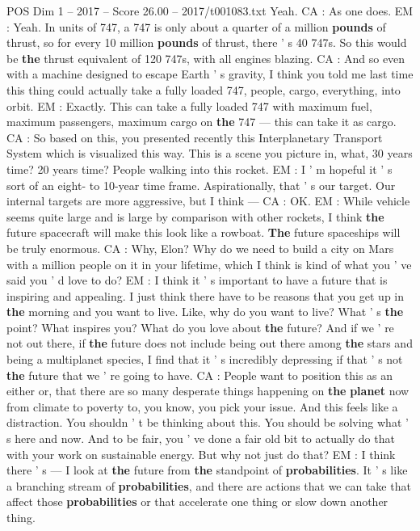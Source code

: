 \begin{textsample}{POS Dim 1 – 2017 – Score 26.00 – 2017/t001083.txt}
Yeah.
CA : As one does.
EM : Yeah.
In units of 747, a 747 is only about a quarter of a million \textbf{pounds} of thrust, so for every 10 million \textbf{pounds} of thrust, there ' s 40 747s.
So this would be \textbf{the} thrust equivalent of 120 747s, with all engines blazing.
CA : And so even with a machine designed to escape Earth ' s gravity, I think you told me last time this thing could actually take a fully loaded 747, people, cargo, everything, into orbit.
EM : Exactly.
This can take a fully loaded 747 with maximum fuel, maximum passengers, maximum cargo on \textbf{the} 747 — this can take it as cargo.
CA : So based on this, you presented recently this Interplanetary Transport System which is visualized this way.
This is a scene you picture in, what, 30 years time? 20 years time?
People walking into this rocket.
EM : I ' m hopeful it ' s sort of an eight- to 10-year time frame.
Aspirationally, that ' s our target.
Our internal targets are more aggressive, but I think — CA : OK.
EM : While vehicle seems quite large and is large by comparison with other rockets, I think \textbf{the} future spacecraft will make this look like a rowboat. \textbf{The} future spaceships will be truly enormous.
CA : Why, Elon?
Why do we need to build a city on Mars with a million people on it in your lifetime, which I think is kind of what you ' ve said you ' d love to do?
EM : I think it ' s important to have a future that is inspiring and appealing.
I just think there have to be reasons that you get up in \textbf{the} morning and you want to live.
Like, why do you want to live?
What ' s \textbf{the} point?
What inspires you?
What do you love about \textbf{the} future?
And if we ' re not out there, if \textbf{the} future does not include being out there among \textbf{the} stars and being a multiplanet species, I find that it ' s incredibly depressing if that ' s not \textbf{the} future that we ' re going to have.
CA : People want to position this as an either or, that there are so many desperate things happening on \textbf{the} \textbf{planet} now from climate to poverty to, you know, you pick your issue.
And this feels like a distraction.
You shouldn ' t be thinking about this.
You should be solving what ' s here and now.
And to be fair, you ' ve done a fair old bit to actually do that with your work on sustainable energy.
But why not just do that?
EM : I think there ' s — I look at \textbf{the} future from \textbf{the} standpoint of \textbf{probabilities}.
It ' s like a branching stream of \textbf{probabilities}, and there are actions that we can take that affect those \textbf{probabilities} or that accelerate one thing or slow down another thing.

\end{textsample}
